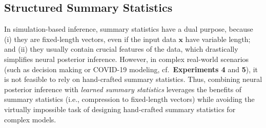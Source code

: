 \documentclass[twoside,11pt]{article}
\newcommand{\numberDDM}{4}
\newcommand{\numberCovid}{5}
\newcommand{\x}{\boldsymbol{x}}
\newcommand{\0}{\boldsymbol{0}}
\begin{document}
\subsection{Structured Summary Statistics}\label{sec:structured-summary-statistics}
In simulation-based inference, summary statistics have a dual purpose, because (i) they are fixed-length vectors, even if the input data $\x$ have variable length; and (ii) they usually contain crucial features of the data, which drastically simplifies neural posterior inference.
However, in complex real-world scenarios (such as decision making or COVID-19 modeling, cf.\ \textbf{Experiments \numberDDM} and \textbf{\numberCovid}), it is not feasible to rely on hand-crafted summary statistics.
Thus, combining neural posterior inference with \emph{learned summary statistics} leverages the benefits of summary statistics (i.e., compression to fixed-length vectors) while avoiding the virtually impossible task of designing hand-crafted summary statistics for complex models.
\end{document}
